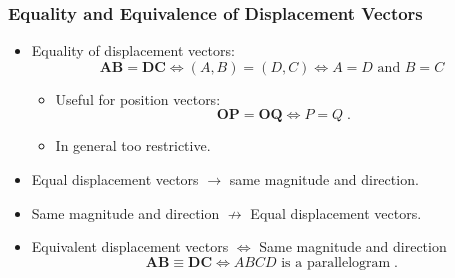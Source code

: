\begin{frame}
 \frametitle{Equality and Equivalence of Displacement Vectors}

  \begin{itemize}
   \item Equality of displacement vectors: \pause
    $$\textbf{AB} = \textbf{DC} \Longleftrightarrow (A,B) = (D,C) \Longleftrightarrow A=D \text{ and } B=C$$
    \begin{itemize}
      \item Useful for position vectors:
      $$\textbf{OP} = \textbf{OQ} \Longleftrightarrow P=Q\; .$$
      \item In general too restrictive. \pause
    \end{itemize}
    \item Equal displacement vectors $\rightarrow$ same magnitude and direction.
    \item Same magnitude and direction $\not\rightarrow$ Equal displacement vectors. \pause
    \item  Equivalent displacement vectors $\Leftrightarrow$ Same magnitude and direction
    $$\textbf{AB} \equiv \textbf{DC} \Longleftrightarrow ABCD \text{ is a parallelogram}\;.$$
  \end{itemize}

\end{frame}

